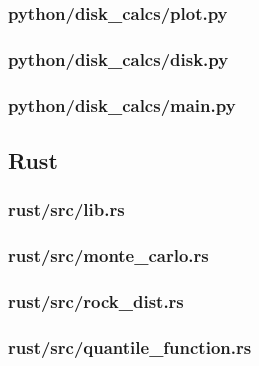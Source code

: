 \subsubsection{python/disk_calcs/plot.py}

\subsubsection{python/disk_calcs/disk.py}

\subsubsection{python/disk_calcs/main.py}

\subsection{Rust}
\subsubsection{rust/src/lib.rs}

\subsubsection{rust/src/monte_carlo.rs}

\subsubsection{rust/src/rock_dist.rs}

\subsubsection{rust/src/quantile_function.rs}

